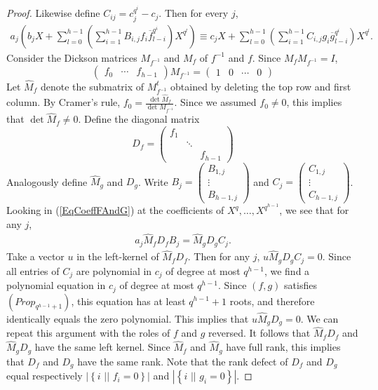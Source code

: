 \documentclass[a4paper]{article}
\theoremstyle{definition}
\newcommand{\sett}[2]{ \left\{ #1 \, \, || \, \, #2 \right \} }
\begin{document}
\begin{proof}
Likewise define $C_{ij} = c_j^{q^i} - c_j$.
Then for every $j$,
\begin{align}
 \label{EqCoeffFAndG}
 a_j \left( b_j X + \sum_{l=0}^{h-1} \left( \sum_{i=1}^{h-1} B_{i,j} f_i \overline f_{l-i}^{q^i} \right) X^{q^l} \right)
 \equiv c_j X + \sum_{l=0}^{h-1} \left( \sum_{i=1}^{h-1} C_{i,j} g_i \overline g_{l-i}^{q^i} \right) X^{q^l}.
\end{align}
Consider the Dickson matrices $M_{f^{-1}}$ and $M_f$ of $f^{-1}$ and $f$.
Since $M_f M_{f^{-1}} = I$,
\[
 \begin{pmatrix}
 f_0 & \cdots & f_{h-1}
 \end{pmatrix}
 M_{f^{-1}} = \begin{pmatrix}
 1 & 0 & \cdots & 0
 \end{pmatrix}
\]
Let $\hat M_f$ denote the submatrix of $M_{f^{-1}}^t$ obtained by deleting the top row and first column.
By Cramer's rule, $ \displaystyle f_0 = \frac{ \det \hat M_f }{ \det M_{f^{-1}} }$.
Since we assumed $f_0 \neq 0$, this implies that $\det \hat M_f \neq 0$.
Define the diagonal matrix
\[
 D_f = \begin{pmatrix}
 f_1 \\ & \ddots \\ & & f_{h-1}
\end{pmatrix}
\]
Analogously define $\hat M_g$ and $D_g$.
Write $B_j = \begin{pmatrix} B_{1,j} \\ \vdots \\ B_{h-1,j} \end{pmatrix}$ and $C_j = \begin{pmatrix} C_{1,j} \\ \vdots \\ C_{h-1, j} \end{pmatrix}$.
Looking in (\ref{EqCoeffFAndG}) at the coefficients of $X^{q}, \dots, X^{q^{h-1}}$, we see that for any $j$,
\begin{align}
 \label{EqMatrixForm}
 a_j \hat M_f D_f B_j = \hat M_g D_g C_j.
\end{align}
Take a vector $u$ in the left-kernel of $\hat M_f D_f$.
Then for any $j$, $u \hat M_g D_g C_j = 0$.
Since all entries of $C_{j}$ are polynomial in $c_j$ of degree at most $q^{h-1}$, we find a polynomial equation in $c_j$ of degree at most $q^{h-1}$.
Since $(f,g)$ satisfies $(Prop_{q^{h-1}+1})$, this equation has at least $q^{h-1}+1$ roots, and therefore identically equals the zero polynomial.
This implies that $u \hat M_g D_g = 0$.
We can repeat this argument with the roles of $f$ and $g$ reversed.
It follows that $\hat M_f D_f$ and $\hat M_g D_g$ have the same left kernel.
Since $\hat M_f$ and $\hat M_g$ have full rank, this implies that $D_f$ and $D_g$ have the same rank.
Note that the rank defect of $D_f$ and $D_g$ equal respectively $|\sett i {f_i = 0}|$ and $|\sett i {g_i = 0}|$.


\end{proof}
\end{document}

